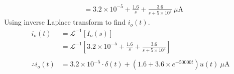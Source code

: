 \begin{enumerate}
{\begin{align*}
			&= 3.2\times10^{-5} + \frac{1.6}{s} + \frac{3.6}{s+5\times10^4} \ \mu \mathrm{A}
		\end{align*}
		Using inverse Laplace transform to find $i_o(t)$.
		\begin{align*}
			i_o(t) &= \mathcal{L}^{-1}\left[ I_o(s) \right] \\
			&= \mathcal{L}^{-1} \left[3.2\times10^{-5} + \frac{1.6}{s} + \frac{3.6}{s+5\times10^4} \right] \\
			\\
			\therefore i_o(t) &= 3.2 \times 10^{-5} \cdot \delta(t) + \left(1.6 + 3.6 \times e^{-50000t} \right) u(t) \ \mu \mathrm{A}
		\end{align*}
	}

\end{enumerate}
